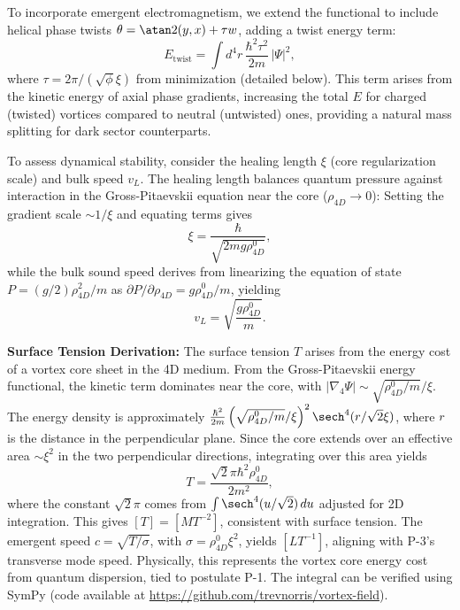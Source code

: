 To incorporate emergent electromagnetism, we extend the functional to include helical phase twists $\theta = \atan2(y, x) + \tau w$, adding a twist energy term:
\begin{equation}
E_{\text{twist}} = \int d^4 r \, \frac{\hbar^2 \tau^2}{2m} \, |\Psi|^2,
\end{equation}
where $\tau = 2\pi / (\sqrt{\phi} \xi)$ from minimization (detailed below). This term arises from the kinetic energy of axial phase gradients, increasing the total $E$ for charged (twisted) vortices compared to neutral (untwisted) ones, providing a natural mass splitting for dark sector counterparts.

To assess dynamical stability, consider the healing length $\xi$ (core regularization scale) and bulk speed $v_L$. The healing length balances quantum pressure against interaction in the Gross-Pitaevskii equation near the core ($\rho_{4D} \to 0$): Setting the gradient scale $\sim 1/\xi$ and equating terms gives
\begin{equation}
\xi = \frac{\hbar}{\sqrt{2 m g \rho_{4D}^0}},
\end{equation}
while the bulk sound speed derives from linearizing the equation of state $P = (g/2) \rho_{4D}^2 / m$ as $\partial P / \partial \rho_{4D} = g \rho_{4D}^0 / m$, yielding
\begin{equation}
v_L = \sqrt{\frac{g \rho_{4D}^0}{m}}.
\end{equation}

\textbf{Surface Tension Derivation:} The surface tension $T$ arises from the energy cost of a vortex core sheet in the 4D medium. From the Gross-Pitaevskii energy functional, the kinetic term dominates near the core, with $|\nabla_4 \Psi| \sim \sqrt{\rho_{4D}^0 / m} / \xi$. The energy density is approximately $\frac{\hbar^2}{2m} \left( \sqrt{\rho_{4D}^0 / m} / \xi \right)^2 \sech^4(r / \sqrt{2} \xi)$, where $r$ is the distance in the perpendicular plane. Since the core extends over an effective area $\sim \xi^2$ in the two perpendicular directions, integrating over this area yields
\begin{equation}
T = \frac{\sqrt{2} \pi \hbar^2 \rho_{4D}^0}{2 m^2},
\end{equation}
where the constant $\sqrt{2} \pi$ comes from $\int \sech^4(u / \sqrt{2}) \, du$ adjusted for 2D integration. This gives $[T] = [M T^{-2}]$, consistent with surface tension. The emergent speed $c = \sqrt{T / \sigma}$, with $\sigma = \rho_{4D}^0 \xi^2$, yields $[L T^{-1}]$, aligning with P-3's transverse mode speed. Physically, this represents the vortex core energy cost from quantum dispersion, tied to postulate P-1. The integral can be verified using SymPy (code available at \url{https://github.com/trevnorris/vortex-field}).

